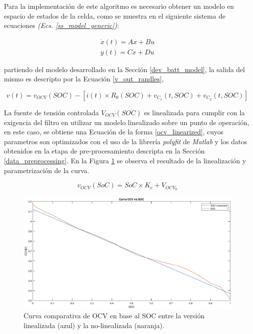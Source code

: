 \documentclass[10pt,a4paper]{article}
\begin{document}
Para la implementaci\'on de este algoritmo es necesario obtener un modelo en
espacio de estados de la celda, como se muestra en el siguiente sistema de
ecuaciones \emph{(Ecs. \ref{ss_model_generic})}:

\begin{align}
    \dot{x}(t) = Ax+Bu	\nonumber\\
    y(t)=Cx+Du
    \label{ss_model_generic}	
\end{align}

partiendo del modelo desarrollado en la Secci\'on \ref{dev_batt_model}, la
salida del mismo es descripto por la Ecuaci\'on \ref{v_out_randles},

\begin{equation}
    v(t) = v_{OCV}(SOC) - \left[i(t) \times R_0\left(SOC\right)  + v_{C_1}\left(t,
    SOC\right) + v_{C_2}\left(t, SOC\right)\right] \label{v_out_randles}
\end{equation}

\noindent La fuente de tensión controlada $V_{OCV}(SOC)$ es linealizada para 
cumplir con la exigencia del filtro en utilizar un modelo linealizado sobre un
punto de operaci\'on, en este caso, se obtiene una Ecuaci\'on de la forma
\ref{ocv_linearized}, cuyos parametros son optimizados con el uso de la
librer\'ia \emph{polyfit} de \emph{Matlab} y los datos obtenidos en la etapa de
pre-procesamiento descripta en la Secci\'on \ref{data_preprocessing}. En la 
Figura \ref{soc_linealized} se observa el resultado de la linealizaci\'on y
parametrizaci\'on de la curva.

\begin{equation}
    v_{OCV}(SoC) = SoC \times K_e + V_{OCV_0} 
    \label{ocv_linearized}
\end{equation}

\begin{figure}[h!]
    \begin{center}
	\includegraphics[width=1\textwidth]{SOC_vs_OCV.eps}
    \caption{Curva comparativa de \acrshort{OCV} en base al \acrshort{SOC} 
    entre la versi\'on linealizada (azul) y la no-linealizada (naranja).} 
	\label{soc_linealized}
    \end{center}
\end{figure}
\FloatBarrier
\end{document}
